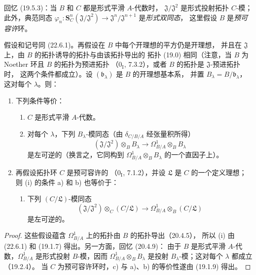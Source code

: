 回忆 (19.5.3)：当 $B$ 和 $C$ 都是形式平滑 $A$-代数时，
$\mathfrak J/\mathfrak J^2$ 是形式投射拓扑 $C$-模；此外，典范同态
$\varphi_n:\mathbf S_C^n(\mathfrak J/\mathfrak J^2)
\longrightarrow\mathfrak J^n/\mathfrak J^{n+1}$ 是\emph{形式双同态}，
这里假设 $B$ 是\emph{预可容许}环。
\begin{corollary}[22.6.2]
\label{0.22.6.2-fr}
假设和记号同 (22.6.1)。再假设在 $B$ 中每个开理想的平方仍是开理想，
并且在 $\mathfrak J$ 上，由 $B$ 的拓扑诱导的拓扑与由该拓扑导出的
拓扑 (19.0) 相同（注意，当 $B$ 为 Noether 环且 $B$ 的拓扑为预进拓扑
（$0_{\mathrm I}$, 7.3.2），或者 $B$ 的拓扑是 $\mathfrak J$-预进拓扑时，
这两个条件都成立）。设 $(\mathfrak b_\lambda)$ 是 $B$ 的开理想基本系，
并置 $B_\lambda=B/\mathfrak b_\lambda$，这对每个 $\lambda$。则：
\begin{enumerate}
  \item[\rm(i)] 下列条件等价：
  \begin{enumerate}
    \item[a)] $C$ 是形式平滑 $A$-代数。
    \item[b)] 对每个 $\lambda$，下列 $B_\lambda$-模同态（由
    $\delta_{C/B/A}$ 经张量积所得）
    \begin{equation}
    \label{0.22.6.2.1-fr}
      (\mathfrak J/\mathfrak J^2)\otimes_BB_\lambda
      \longrightarrow\Omega^1_{B/A}\otimes_BB_\lambda
      \tag{22.6.2.1}
    \end{equation}
    是左可逆的（换言之，它同构到
    $\Omega^1_{B/A}\otimes_BB_\lambda$ 的一个直因子上）。
  \end{enumerate}
  \item[\rm(ii)] 再假设拓扑环 $C$ 是预可容许的
  （$0_{\mathrm I}$, 7.1.2），并设 $\mathfrak L$ 是 $C$ 的一个定义理想；
  则 (i) 的条件 a) 和 b) 也等价于：


  \begin{enumerate}
    \item[c)] 下列 $(C/\mathfrak L)$-模同态
    \[
      (\mathfrak J/\mathfrak J^2)\otimes_C(C/\mathfrak L)
      \longrightarrow\Omega^1_{B/A}\otimes_B(C/\mathfrak L)
    \]
    是左可逆的。
  \end{enumerate}
\end{enumerate}
\end{corollary}

\begin{proof}
这些假设蕴含 $\Omega^1_{B/A}$ 上的拓扑由 $B$ 的拓扑导出（20.4.5），
所以 (i) 由 (22.6.1) 和 (19.1.7) 得出。另一方面，回忆 (20.4.9)：
由于 $B$ 是形式平滑 $A$-代数，$\Omega^1_{B/A}$ 是形式投射
$B$-模，因而 $\Omega^1_{B/A}\otimes_BB_\lambda$ 是投射
$B_\lambda$-模；这对每个 $\lambda$ 都成立（19.2.4）。
当 $C$ 为预可容许环时，c) 与 a)、b) 的等价性遂由 (19.1.9) 得出。
\end{proof}

